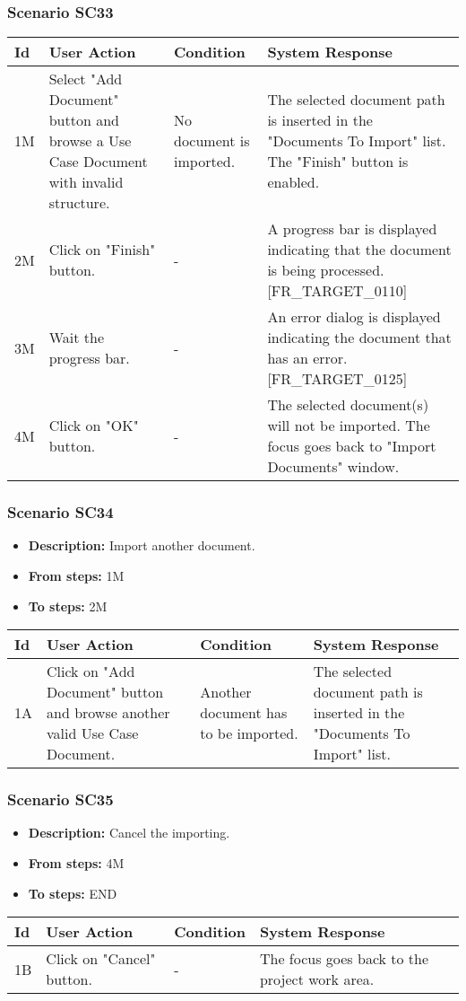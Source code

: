 \documentclass[a4paper,11pt]{article}
\newcommand{\bl}{\\ \hline}
\begin{document}
\subsubsection*{Scenario SC33}
\begin{tabular}{|p{0.4in}|p{1.5in}|p{1.5in}|p{1.5in}|}
\hline
Id & User Action & Condition & System Response \bl 
1M & Select "Add Document" button and browse a Use Case Document
						with invalid structure. & No document is imported. & The selected document path is inserted in the "Documents
						To Import" list. The "Finish" button is enabled.\bl
2M & Click on "Finish" button. & - & A progress bar is displayed indicating that the document
						is being processed. [FR_TARGET_0110] \bl
3M & Wait the progress bar. & - & An error dialog is displayed indicating the document that
						has an error. [FR_TARGET_0125] \bl
4M & Click on "OK" button. & - & The selected document(s) will not be imported. The focus
						goes back to "Import Documents" window.\bl
\end{tabular}
\subsubsection*{Scenario SC34}
\begin{itemize}
\item {\bf Description:} Import another document.
\item {\bf From steps:} 1M
\item {\bf To steps:} 2M
\end{itemize}
\begin{tabular}{|p{0.4in}|p{1.5in}|p{1.5in}|p{1.5in}|}
\hline
Id & User Action & Condition & System Response \bl 
1A & Click on "Add Document" button and browse another valid Use
						Case Document. & Another document has to be imported. & The selected document path is inserted in the "Documents
						To Import" list.\bl
\end{tabular}
\subsubsection*{Scenario SC35}
\begin{itemize}
\item {\bf Description:} Cancel the importing.
\item {\bf From steps:} 4M
\item {\bf To steps:} END
\end{itemize}
\begin{tabular}{|p{0.4in}|p{1.5in}|p{1.5in}|p{1.5in}|}
\hline
Id & User Action & Condition & System Response \bl 
1B & Click on "Cancel" button. & - & The focus goes back to the project work area.\bl
\end{tabular}
\end{document}
